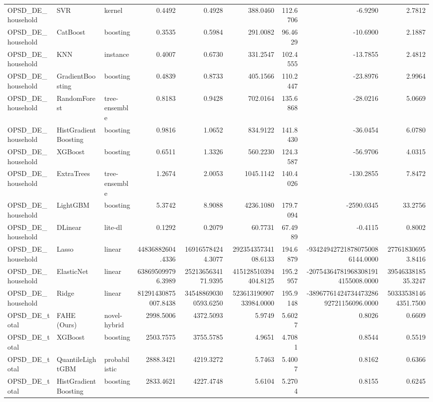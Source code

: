\begin{tabular}{lllrrrrrr}
OPSD_DE_household & SVR & kernel & 0.4492 & 0.4928 & 388.0460 & 112.6706 & -6.9290 & 2.7812 \\
OPSD_DE_household & CatBoost & boosting & 0.3535 & 0.5984 & 291.0082 & 96.4629 & -10.6900 & 2.1887 \\
OPSD_DE_household & KNN & instance & 0.4007 & 0.6730 & 331.2547 & 102.4555 & -13.7855 & 2.4812 \\
OPSD_DE_household & GradientBoosting & boosting & 0.4839 & 0.8733 & 405.1566 & 110.2447 & -23.8976 & 2.9964 \\
OPSD_DE_household & RandomForest & tree-ensemble & 0.8183 & 0.9428 & 702.0164 & 135.6868 & -28.0216 & 5.0669 \\
OPSD_DE_household & HistGradientBoosting & boosting & 0.9816 & 1.0652 & 834.9122 & 141.8430 & -36.0454 & 6.0780 \\
OPSD_DE_household & XGBoost & boosting & 0.6511 & 1.3326 & 560.2230 & 124.3587 & -56.9706 & 4.0315 \\
OPSD_DE_household & ExtraTrees & tree-ensemble & 1.2674 & 2.0053 & 1045.1142 & 140.4026 & -130.2855 & 7.8472 \\
OPSD_DE_household & LightGBM & boosting & 5.3742 & 8.9088 & 4236.1080 & 179.7094 & -2590.0345 & 33.2756 \\
OPSD_DE_household & DLinear & lite-dl & 0.1292 & 0.2079 & 60.7731 & 67.4989 & -0.4115 & 0.8002 \\
OPSD_DE_household & Lasso & linear & 44836882604.4336 & 169165784244.3077 & 29235435734108.6133 & 194.6879 & -934249427218780750086144.0000 & 277618306953.8416 \\
OPSD_DE_household & ElasticNet & linear & 638695099796.3989 & 2521365634171.9395 & 415128510394404.8125 & 195.2957 & -207543647819683081914155008.0000 & 3954633818535.3247 \\
OPSD_DE_household & Ridge & linear & 81291430875007.8438 & 345488690300593.6250 & 52361319090733984.0000 & 195.9148 & -3896776142473447328692721156096.0000 & 503335381464351.7500 \\
OPSD_DE_total & FAHE (Ours) & novel-hybrid & 2998.5006 & 4372.5093 & 5.9749 & 5.6027 & 0.8026 & 0.6609 \\
OPSD_DE_total & XGBoost & boosting & 2503.7575 & 3755.5785 & 4.9651 & 4.7081 & 0.8544 & 0.5519 \\
OPSD_DE_total & QuantileLightGBM & probabilistic & 2888.3421 & 4219.3272 & 5.7463 & 5.4007 & 0.8162 & 0.6366 \\
OPSD_DE_total & HistGradientBoosting & boosting & 2833.4621 & 4227.4748 & 5.6104 & 5.2704 & 0.8155 & 0.6245 \\

\end{tabular}
